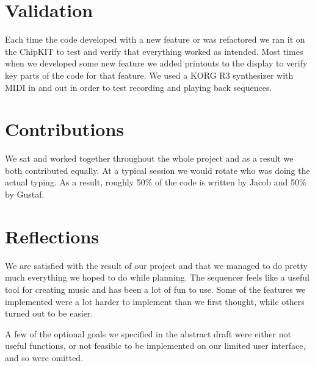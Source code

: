 \documentclass[a4paper,10pt]{article}
\begin{document}
\section{Validation}
Each time the code developed with a new feature or was refactored we ran it on the ChipKIT to test and verify that everything worked as intended. Most times when we developed some new feature we added printouts to the display to verify key parts of the code for that feature. We used a KORG R3 synthesizer with MIDI in and out in order to test recording and playing back sequences.



\section{Contributions}
We sat and worked together throughout the whole project and as a result we both contributed equally. At a typical session we would rotate who was doing the actual typing. As a result, roughly 50\% of the code is written by Jacob and 50\% by Gustaf.


\section{Reflections}
We are satisfied with the result of our project and that we managed to do pretty much everything we hoped to do while planning. The sequencer feels like a useful tool for creating music and has been a lot of fun to use. Some of the features we implemented were a lot harder to implement than we first thought, while others turned out to be easier.

A few of the optional goals we specified in the abstract draft were either not useful functions, or not feasible to be implemented on our limited user interface, and so were omitted.
\end{document}
